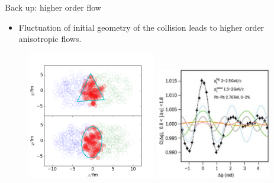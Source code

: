 \documentclass[11pt]{beamer}
\begin{document}
\begin{frame}[noframenumbering]{Back up: higher order flow}
\begin{itemize}
\item Fluctuation of initial geometry of the collision leads to higher order anisotropic flows.
\end{itemize}
\begin{center}
\begin{figure}
\includegraphics[width = 0.5\textwidth]{./pics/nuclei.png}
\includegraphics[width = 0.45\textwidth]{./pics/corr_ALICE.png}
\end{figure}
\end{center}
\end{frame}
\end{document}
